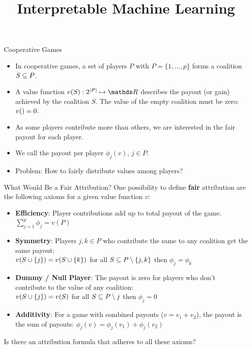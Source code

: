 \documentclass[11pt,compress,t,notes=noshow, xcolor=table]{beamer}
\title{Interpretable Machine Learning}
\institute{\href{https://compstat-lmu.github.io/lecture_i2ml/}{compstat-lmu.github.io/lecture\_i2ml}}
\date{}
\begin{document}

\begin{vbframe}{Cooperative Games}
\begin{itemize}
  \item In cooperative games, a set of players $P$ with $P = \{1, \hdots, p\}$ forms a coalition $\SsubP$. 
  \item A value function $v(S): 2^{|P|}\mapsto \R$ describes the payout (or gain) achieved by the coalition $S$. The value of the empty coalition must be zero: $v(\empty) = 0$.
  \item As some players contribute more than others, we are interested in the fair payout for each player.
  \item We call the payout per player $\phi_j(v) $, $j \in P$.
  \item Problem: How to fairly distribute values among players?
\end{itemize}
\end{vbframe}


\begin{vbframe}{What Would Be a Fair Attribution?}
  One possibility to define \textbf{fair} attribution are the following axioms for a given value function $v$:
  \begin{itemize}
    \item \textbf{Efficiency}: Player contributions add up to total payout of the game.
      $\sum\nolimits_{j=1}^p\phi_j = v(P)$
    \item \textbf{Symmetry}: Players $j,k \in P$ who contribute the same to any coalition get the same payout: \\
      $v(\Scupj) = v(\Scupk)$ for all $\SsubP \setminus\{j,k\}$ then $\phi_j=\phi_k$
    \item \textbf{Dummy / Null Player}: The payout is zero for players who don't contribute to the value of any coalition: \\
      $v(\Scupj)=v(S)$ for all $\SsubP \setminus j$ then $\phi_j=0$
    \item \textbf{Additivity}: For a game with combined payouts ($v = v_1 + v_2$), the payout is the sum of payouts: $\phi_j(v) = \phi_j(v_1) + \phi_{j}(v_2)$
  \end{itemize}

  Is there an attribution formula that adheres to all these axioms?

\end{vbframe}
\end{document}
